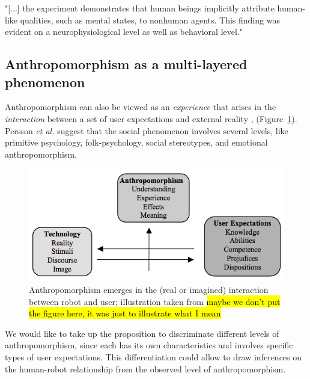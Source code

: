 \documentclass{frontiersSCNS} %
\begin{document}
	

"[...] the experiment demonstrates that human beings implicitly attribute
human-like qualities, such as mental states, to nonhuman agents. This finding
was evident on a neurophysiological level as well as behavioral level."
\cite{hegel_understanding_2008}
	


\subsection{Anthropomorphism as a multi-layered phenomenon}
\label{sec:3.4}

Anthropomorphism can also be viewed as an \textit{experience} that arises in the
\textit{interaction} between a set of user expectations and external reality
\cite{persson_anthropomorphism_2000},
(Figure~\ref{fig:anthropomorphism_and_interaction}). Persson \textit{et al.}
suggest that the social phenomenon involves several levels, like primitive
psychology, folk-psychology, social stereotypes, and emotional anthropomorphism. 

\begin{figure}[ht!]\centering
  \includegraphics[scale=0.42]{persson_anthropomorphism.png}
 \caption{Anthropomorphism emerges in the (real or imagined) interaction between
 robot and user; illustration taken from \cite{persson_anthropomorphism_2000}
 \hl{maybe we don't put the figure here, it was just to illustrate what I mean}}

 \label{fig:anthropomorphism_and_interaction}       %
 \end{figure}

We would like to take up the proposition to discriminate different levels of
anthropomorphism, since each has its own characteristics and involves specific
types of user expectations. This differentiation could allow to draw inferences
on the human-robot relationship from the observed level of anthropomorphism.
\end{document}
